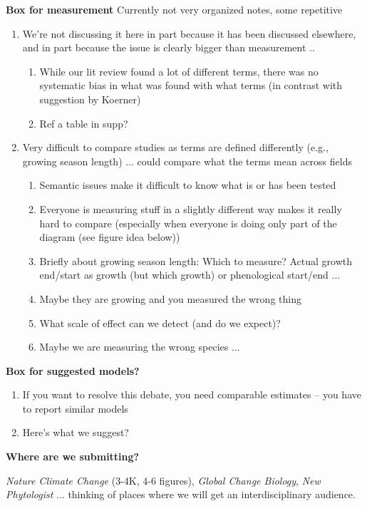 \documentclass[11pt,letter]{article}
\begin{document}
\vspace{5ex}
{\bf Box for measurement} Currently not very organized notes, some repetitive
\begin{enumerate}
\item We're not discussing it here in part because it has been discussed elsewhere, and in part because the issue is clearly bigger than measurement ..
\begin{enumerate}
\item While our lit review found a lot of different terms, there was no systematic bias in what was found with what terms (in contrast with suggestion by Koerner) 
\item Ref a table in supp?
\end{enumerate}
\item Very difficult to compare studies as terms are defined differently (e.g., growing season length) ... could compare what the terms mean across fields
\begin{enumerate}
\item Semantic issues make it difficult to know what is or has been tested
\item Everyone is measuring stuff in a slightly different way makes it really hard to compare (especially when everyone is doing only part of the diagram (see figure idea below))
\item Briefly about growing season length: Which to measure? Actual growth end/start as growth (but which growth) or phenological start/end ... 
\item Maybe they are growing and you measured the wrong thing
\item What scale of effect can we detect (and do we expect)?
\item Maybe we are measuring the wrong species ...
\end{enumerate}
\end{enumerate}

{\bf Box for suggested models?}
\begin{enumerate}
\item If you want to resolve this debate, you need comparable estimates -- you have to report similar models 
\item Here's what we suggest?
\end{enumerate}

{\bf Where are we submitting?}

\emph{Nature Climate Change} (3-4K, 4-6 figures), \emph{Global Change Biology}, \emph{New Phytologist} ... thinking of places where we will get an interdisciplinary audience.\\
\end{document}
